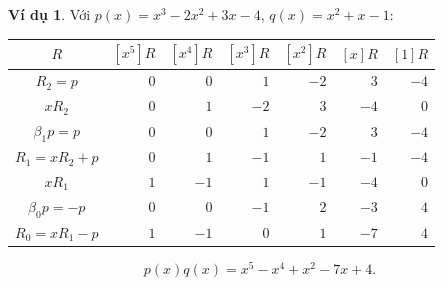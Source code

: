 \documentclass[12pt,a4paper,oneside]{book}
\numberwithin{algorithm}{chapter}
\theoremstyle{definition}
\newtheorem{vidu}{Ví dụ}[chapter]
\begin{document}
\begin{vidu}
Với $p(x)=x^3-2x^2+3x-4$, $q(x)=x^2+x-1$:
\begin{center}
\begin{tabular}{c|rrrrrr}
\toprule
$R$ & $[x^5]R$ & $[x^4]R$ & $[x^3]R$ & $[x^2]R$ & $[x]R$ & $[1]R$\\
\midrule
$R_2=p$ & $0$ & $0$ & $1$ & $-2$ & $3$ & $-4$\\
$xR_2$ & $0$ & $1$ & $-2$ & $3$ & $-4$ & $0$\\
$\beta_1p=p$ & $0$ & $0$ & $1$ & $-2$ & $3$ & $-4$\\
\midrule
$R_1=xR_2+p$ & $0$ & $1$ & $-1$ & $1$ & $-1$ & $-4$\\
$xR_1$ & $1$ & $-1$ & $1$ & $-1$ & $-4$ & $0$\\
$\beta_0p=-p$ & $0$ & $0$ & $-1$ & $2$ & $-3$ & $4$\\
\midrule
$R_0=xR_1-p$ & $1$ & $-1$ & $0$ & $1$ & $-7$ & $4$\\
\bottomrule
\end{tabular}
\end{center}
\[
 p(x)q(x)=x^5-x^4+x^2-7x+4.
\]
\end{vidu}

\end{document}
